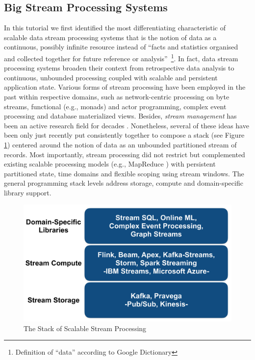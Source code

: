
\subsection{Big Stream Processing Systems} 
\label{sec:tut_systems}

In this tutorial we first identified the most differentiating characteristic of scalable data stream processing systems that is the notion of data as a continuous, possibly infinite resource instead of ``facts and statistics organised and collected together for future reference or analysis''~\footnote{Definition of ``data'' according to Google Dictionary}. In fact, data stream processing systems broaden their context from retrospective data analysis to continuous, unbounded processing coupled with scalable and persistent application state.  Various forms of stream processing have been employed in the past within respective domains, such as network-centric processing on byte streams, functional (e.g., monads) and actor programming, complex event processing and database materialized views. Besides, \emph{stream management} has been an active research field for decades \cite{cherniack2003scalable,chandrasekaran2003telegraphcq,abadi2003aurora,arasu2004stream}. Nonetheless, several of these ideas have been only just recently put consistently together to compose a stack (see Figure \ref{fig:streamstack}) centered around the notion of data as an unbounded partitioned stream of records. Most importantly, stream processing did not restrict but complemented existing scalable processing models (e.g., MapReduce \cite{dean2008mapreduce}) with persistent partitioned state, time domains and flexible scoping using stream windows. The general programming stack levels address storage, compute and domain-specific library support.

\begin{figure}[t]
\centering
\includegraphics[width=0.4 \textwidth]{pictures/streamstack.pdf}
\caption{The Stack of Scalable Stream Processing}
\label{fig:streamstack}
\end{figure}

